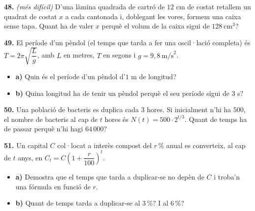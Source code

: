 \documentclass[13pt,a4paper]{extarticle}
\begin{document}
\par\noindent\begin{minipage}{\linewidth}
\textbf{48.} \emph{(més difícil)} D'una làmina quadrada de cartró de $12$ cm de costat retallem un quadrat de costat $x$ a cada cantonada i, doblegant les vores, formem una caixa sense tapa. Quant ha de valer $x$ perquè el volum de la caixa sigui de $128\ \text{cm}^3$?\par
\end{minipage}\par\vspace{1.6mm}
\par\noindent\begin{minipage}{\linewidth}
\textbf{49.} El període d'un pèndol (el temps que tarda a fer una oscil·lació completa) és $T=2\pi\sqrt{\dfrac{L}{g}}$, amb $L$ en metres, $T$ en segons i $g=9{,}8\ \text{m/s}^2$.\par

\begin{itemize}[leftmargin=0pt,itemsep=6pt,topsep=4pt,parsep=0pt,label={}]
\item \textbf{a)} Quin és el període d'un pèndol d'$1$ m de longitud?
\item \textbf{b)} Quina longitud ha de tenir un pèndol perquè el seu període sigui de $3$ s?
\end{itemize}
\end{minipage}\par\vspace{1.6mm}
\par\noindent\begin{minipage}{\linewidth}
\textbf{50.} Una població de bacteris es duplica cada $3$ hores. Si inicialment n'hi ha $500$, el nombre de bacteris al cap de $t$ hores és $N(t)=500\cdot 2^{t/3}$. Quant de temps ha de passar perquè n'hi hagi $64\,000$?\par
\end{minipage}\par\vspace{1.6mm}
\par\noindent\begin{minipage}{\linewidth}
\textbf{51.} Un capital $C$ col·locat a interès compost del $r\,\%$ anual es converteix, al cap de $t$ anys, en $C_t=C\left(1+\dfrac{r}{100}\right)^{t}$.\par

\begin{itemize}[leftmargin=0pt,itemsep=6pt,topsep=4pt,parsep=0pt,label={}]
\item \textbf{a)} Demostra que el temps que tarda a duplicar-se no depèn de $C$ i troba'n una fórmula en funció de $r$.
\item \textbf{b)} Quant de temps tarda a duplicar-se al $3\,\%$? I al $6\,\%$?
\end{itemize}
\end{minipage}\par\vspace{1.6mm}
\end{document}
